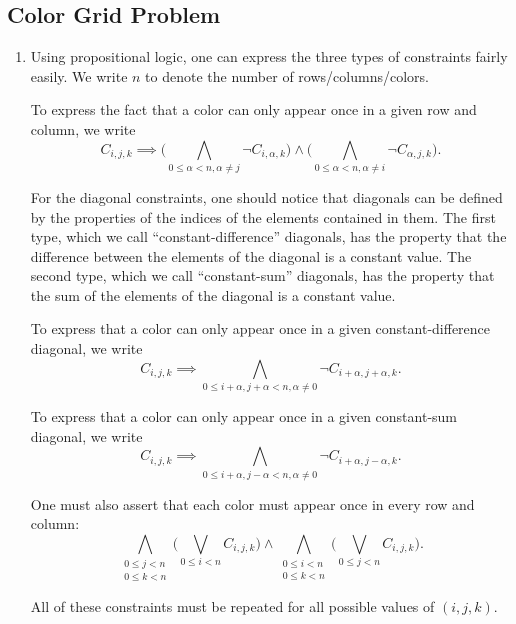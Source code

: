 \documentclass[journal,onecolumn]{IEEEtran}
\begin{document}
\subsection{Color Grid Problem}
\begin{enumerate}
	\item Using propositional logic, one can express the three types of constraints fairly easily.
	We write \(n\) to denote the number of rows/columns/colors.
	
	To express the fact that a color can only appear once in a given row and column, we write
	\[
	C_{i, j, k} \implies \Bigg(\bigwedge_{0 \le \alpha < n, \alpha \ne j} \lnot C_{i, \alpha, k}\Bigg) \land \Bigg(\bigwedge_{0 \le \alpha < n, \alpha \ne i} \lnot C_{\alpha, j, k}\Bigg).
	\]
	
	For the diagonal constraints, one should notice that diagonals can be defined by the properties of the indices of the elements contained in them.
	The first type, which we call ``constant-difference'' diagonals, has the property that the difference between the elements of the diagonal is a constant value.
	The second type, which we call ``constant-sum'' diagonals, has the property that the sum of the elements of the diagonal is a constant value.
	
	To express that a color can only appear once in a given constant-difference diagonal, we write
	\[
	C_{i, j, k} \implies \bigwedge_{0 \le i+\alpha, j+\alpha < n, \alpha \ne 0} \lnot C_{i+\alpha, j+\alpha, k}.
	\]
	
	To express that a color can only appear once in a given constant-sum diagonal, we write
	\[
	C_{i, j, k} \implies \bigwedge_{0 \le i+\alpha, j-\alpha < n, \alpha \ne 0} \lnot C_{i+\alpha, j-\alpha, k}.
	\]
	
	One must also assert that each color must appear once in every row and column:
	\[
	\bigwedge_{\substack{0 \le j < n \\ 0 \le k < n}} \Bigg(\bigvee_{0 \le i < n} C_{i, j, k}\Bigg) \land \bigwedge_{\substack{0 \le i < n \\ 0 \le k < n}} \Bigg(\bigvee_{0 \le j < n} C_{i, j, k}\Bigg).
	\]
	
	All of these constraints must be repeated for all possible values of \((i, j, k)\).
	

\end{enumerate}
\end{document}
